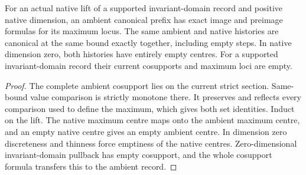 \begin{theorem}
\label{hir:g1-same-bound-native-maxima-canonicality}
\leanok
For an actual native lift of a supported invariant-domain record
and positive native dimension, an ambient canonical prefix has
exact image and preimage formulas for its maximum locus. The same
ambient and native histories are canonical at the same bound
exactly together, including empty steps. In native dimension zero,
both histories have entirely empty centres. For a supported
invariant-domain record their current cosupports and maximum loci
are empty.
\end{theorem}
\begin{proof}
The complete ambient cosupport lies on the current strict section.
Same-bound value comparison is strictly monotone there. It
preserves and reflects every comparison used to define the
maximum, which gives both set identities. Induct on the lift.
The native maximum centre maps onto the ambient maximum centre,
and an empty native centre gives an empty ambient centre. In
dimension zero discreteness and thinness force emptiness of the
native centres. Zero-dimensional invariant-domain pullback has
empty cosupport, and the whole cosupport formula transfers this to
the ambient record.
\end{proof}

